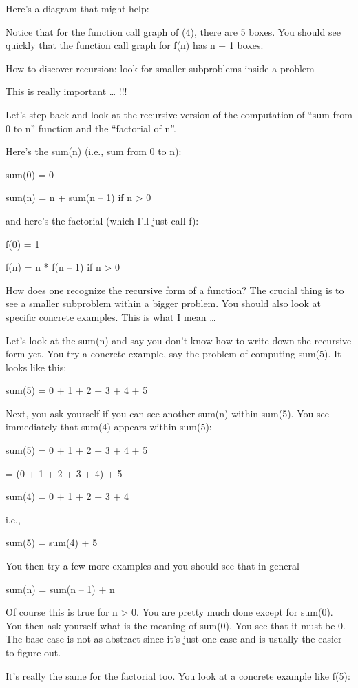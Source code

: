 \documentclass[
]{article}
\begin{document}
Here's a diagram that might help:

Notice that for the function call graph of (4), there are 5 boxes. You
should see quickly that the function call graph for f(n) has n + 1
boxes.

How to discover recursion: look for smaller subproblems inside a problem

This is really important \ldots{} !!!

Let's step back and look at the recursive version of the computation of
``sum from 0 to n'' function and the ``factorial of n''.

Here's the sum(n) (i.e., sum from 0 to n):

sum(0) = 0

sum(n) = n + sum(n -- 1) if n \textgreater{} 0

and here's the factorial (which I'll just call f):

f(0) = 1

f(n) = n * f(n -- 1) if n \textgreater{} 0

How does one recognize the recursive form of a function? The crucial
thing is to see a smaller subproblem within a bigger problem. You should
also look at specific concrete examples. This is what I mean \ldots{}

Let's look at the sum(n) and say you don't know how to write down the
recursive form yet. You try a concrete example, say the problem of
computing sum(5). It looks like this:

sum(5) = 0 + 1 + 2 + 3 + 4 + 5

Next, you ask yourself if you can see another sum(n) within sum(5). You
see immediately that sum(4) appears within sum(5):

sum(5) = 0 + 1 + 2 + 3 + 4 + 5

= (0 + 1 + 2 + 3 + 4) + 5

sum(4) = 0 + 1 + 2 + 3 + 4

i.e.,

sum(5) = sum(4) + 5

You then try a few more examples and you should see that in general

sum(n) = sum(n -- 1) + n

Of course this is true for n \textgreater{} 0. You are pretty much done
except for sum(0). You then ask yourself what is the meaning of sum(0).
You see that it must be 0. The base case is not as abstract since it's
just one case and is usually the easier to figure out.

It's really the same for the factorial too. You look at a concrete
example like f(5):
\end{document}
